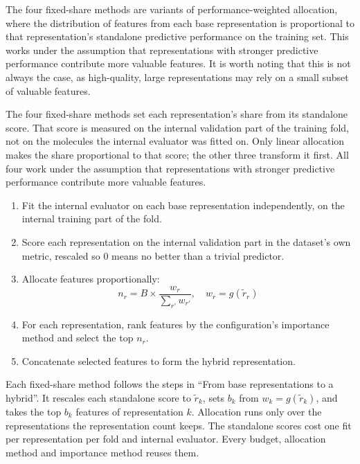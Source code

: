 The four fixed-share methods are variants of performance-weighted allocation, where the distribution of features from each base representation is proportional to that representation's standalone predictive performance on the training set. This works under the assumption that representations with stronger predictive performance contribute more valuable features. It is worth noting that this is not always the case, as high-quality, large representations may rely on a small subset of valuable features.

The four fixed-share methods set each representation's share from its standalone score. That score is measured on the internal validation part of the training fold, not on the molecules the internal evaluator was fitted on. Only linear allocation makes the share proportional to that score; the other three transform it first. All four work under the assumption that representations with stronger predictive performance contribute more valuable features.

\begin{enumerate}
    \item Fit the internal evaluator on each base representation independently, on the internal training part of the fold.
    \item Score each representation on the internal validation part in the dataset's own metric, rescaled so 0 means no better than a trivial predictor.
    \item Allocate features proportionally:
    \[
    n_r = B \times \frac{w_r}{\sum_{r'} w_{r'}}, \quad w_r = g(\tilde r_r)
    \]
    \item For each representation, rank features by the configuration's importance method and select the top $n_r$.
    \item Concatenate selected features to form the hybrid representation.
\end{enumerate}

Each fixed-share method follows the steps in ``From base representations to a hybrid''. It rescales each standalone score to $\tilde r_k$, sets $b_k$ from $w_k = g(\tilde r_k)$, and takes the top $b_k$ features of representation $k$. Allocation runs only over the representations the representation count keeps. The standalone scores cost one fit per representation per fold and internal evaluator. Every budget, allocation method and importance method reuses them.

